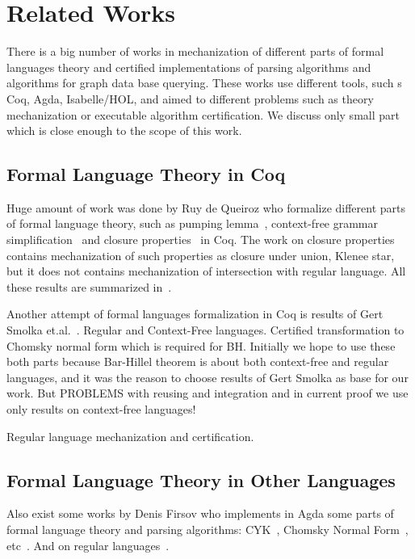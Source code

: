 \section{Related Works}

There is a big number of works in mechanization of different parts of formal languages theory and certified implementations of parsing algorithms and algorithms for graph data base querying.
These works use different tools, such s Coq, Agda, Isabelle/HOL, and aimed to different problems such as theory mechanization or executable algorithm certification.
We discuss only small part which is close enough to the scope of this work.

\subsection{Formal Language Theory in Coq}
Huge amount of work was done by Ruy de Queiroz who formalize different parts of formal language theory, such as pumping lemma~\cite{ramos2015formalizationPumping}, context-free grammar simplification~\cite{ramos2015formalization} and closure properties~\cite{ramos2015formalizationClosure} in Coq.
The work on closure properties contains mechanization of such properties as closure under union, Klenee star, but it does not contains mechanization of intersection with regular language.
All these results are summarized in~\cite{ramos2016formalization}. 

Another attempt of formal languages formalization in Coq is results of Gert Smolka et.al.~\cite{smolka2017regular,smolka2013regular, }.
Regular and Context-Free languages. 
Certified transformation to Chomsky normal form which is required for BH. 
Initially we hope to use these both parts because Bar-Hillel theorem is about both context-free and regular languages, and it was the reason to choose results of Gert Smolka as base for our work.
But PROBLEMS with reusing and integration and in current proof we use only results on context-free languages!

Regular language mechanization and certification.

\subsection{Formal Language Theory in Other Languages}

Also exist some works by Denis Firsov who implements in Agda some parts of formal language theory and parsing algorithms: CYK~\cite{firsov2014certified}, Chomsky Normal Form~\cite{firsov2015certified}, etc~\cite{firsov2016cfl}.
And on regular languages~\cite{10.1007/978-3-319-03545-1_7}.

